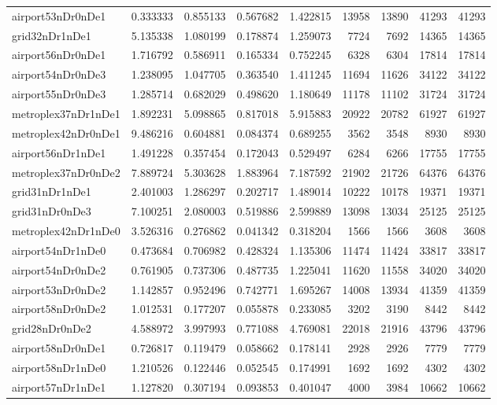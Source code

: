 \begin{longtable}{|l|r|r|r|r|r|r|r|r|}
airport53nDr0nDe1 & 0.333333 & 0.855133 & 0.567682 & 1.422815 & 13958 & 13890 & 41293 & 41293 \\
grid32nDr1nDe1 & 5.135338 & 1.080199 & 0.178874 & 1.259073 & 7724 & 7692 & 14365 & 14365 \\
airport56nDr0nDe1 & 1.716792 & 0.586911 & 0.165334 & 0.752245 & 6328 & 6304 & 17814 & 17814 \\
airport54nDr0nDe3 & 1.238095 & 1.047705 & 0.363540 & 1.411245 & 11694 & 11626 & 34122 & 34122 \\
airport55nDr0nDe3 & 1.285714 & 0.682029 & 0.498620 & 1.180649 & 11178 & 11102 & 31724 & 31724 \\
metroplex37nDr1nDe1 & 1.892231 & 5.098865 & 0.817018 & 5.915883 & 20922 & 20782 & 61927 & 61927 \\
metroplex42nDr0nDe1 & 9.486216 & 0.604881 & 0.084374 & 0.689255 & 3562 & 3548 & 8930 & 8930 \\
airport56nDr1nDe1 & 1.491228 & 0.357454 & 0.172043 & 0.529497 & 6284 & 6266 & 17755 & 17755 \\
metroplex37nDr0nDe2 & 7.889724 & 5.303628 & 1.883964 & 7.187592 & 21902 & 21726 & 64376 & 64376 \\
grid31nDr1nDe1 & 2.401003 & 1.286297 & 0.202717 & 1.489014 & 10222 & 10178 & 19371 & 19371 \\
grid31nDr0nDe3 & 7.100251 & 2.080003 & 0.519886 & 2.599889 & 13098 & 13034 & 25125 & 25125 \\
metroplex42nDr1nDe0 & 3.526316 & 0.276862 & 0.041342 & 0.318204 & 1566 & 1566 & 3608 & 3608 \\
airport54nDr1nDe0 & 0.473684 & 0.706982 & 0.428324 & 1.135306 & 11474 & 11424 & 33817 & 33817 \\
airport54nDr0nDe2 & 0.761905 & 0.737306 & 0.487735 & 1.225041 & 11620 & 11558 & 34020 & 34020 \\
airport53nDr0nDe2 & 1.142857 & 0.952496 & 0.742771 & 1.695267 & 14008 & 13934 & 41359 & 41359 \\
airport58nDr0nDe2 & 1.012531 & 0.177207 & 0.055878 & 0.233085 & 3202 & 3190 & 8442 & 8442 \\
grid28nDr0nDe2 & 4.588972 & 3.997993 & 0.771088 & 4.769081 & 22018 & 21916 & 43796 & 43796 \\
airport58nDr0nDe1 & 0.726817 & 0.119479 & 0.058662 & 0.178141 & 2928 & 2926 & 7779 & 7779 \\
airport58nDr1nDe0 & 1.210526 & 0.122446 & 0.052545 & 0.174991 & 1692 & 1692 & 4302 & 4302 \\
airport57nDr1nDe1 & 1.127820 & 0.307194 & 0.093853 & 0.401047 & 4000 & 3984 & 10662 & 10662 \\

\end{longtable}
